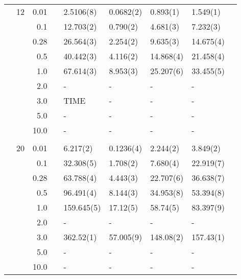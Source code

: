 \begin{table}[H]
\begin{tabularx}{\textwidth}{R{1cm}rrcR{2.3cm}R{2.3cm}R{2.3cm}R{2.3cm}R{1cm}}
		&12 & 0.01 && 2.5106(8) & 0.0682(2) & 0.893(1) & 1.549(1) \\
		&& 0.1 && 12.703(2) & 0.790(2) & 4.681(3) & 7.232(3) \\
		&& 0.28 && 26.564(3) & 2.254(2) & 9.635(3) & 14.675(4) \\
		&& 0.5 && 40.442(3) & 4.116(2) & 14.868(4) & 21.458(4) \\
		&& 1.0 && 67.614(3) & 8.953(3) & 25.207(6) & 33.455(5) \\
		&& 2.0 && - & - & - & -\\
		&& 3.0 && TIME & - & - & - \\ 
		&& 5.0 && - & - & - & -\\
		&& 10.0 && - & - & - & -\\
		\hdashline \\
		
		&20 & 0.01 && 6.217(2) & 0.1236(4) & 2.244(2) & 3.849(2) \\
		&& 0.1 && 32.308(5) & 1.708(2) & 7.680(4) & 22.919(7) \\
		&& 0.28 && 63.788(4) & 4.443(3) & 22.707(6) & 36.638(7) \\
		&& 0.5 && 96.491(4) & 8.144(3) & 34.953(8) & 53.394(8) \\
		&& 1.0 && 159.645(5) & 17.12(5) & 58.74(5) & 83.397(9) \\
		&& 2.0 && - & - & - & -\\
		&& 3.0 && 362.52(1) & 57.005(9) & 148.08(2) & 157.43(1) \\ 
		&& 5.0 && - & - & - & -\\
		&& 10.0 && - & - & - & -\\
		\hline \hline
	\end{tabularx}
\end{table} 


